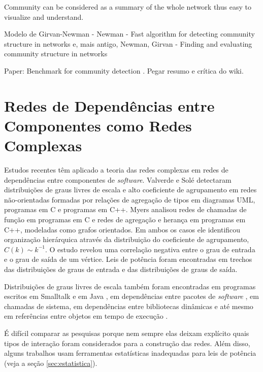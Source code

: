 ﻿\documentclass{article}
\begin{document}
Community can be considered as a summary of
the whole network thus easy to visualize and
understand.

Modelo de Girvan-Newman - Newman - Fast algorithm for detecting community structure in networks \cite{Newman2004b} e, mais antigo, Newman, Girvan - Finding and evaluating community structure in networks \cite{Newman2004a}

Paper: Benchmark for community detection \cite{Lancichinetti2008}. Pegar resumo e crítica do wiki.


\section{Redes de Dependências entre Componentes como Redes Complexas}

Estudos recentes têm aplicado a teoria das redes complexas em redes de dependências entre componentes de \textit{software}. Valverde e Solé \cite{Valverde2003} detectaram distribuições de graus livres de escala e alto coeficiente de agrupamento em redes não-orientadas formadas por relações de agregação de tipos em diagramas UML, programas em C e programas em C++. Myers \cite{Myers2003} analisou redes de chamadas de função em programas em C e redes de agregação e herança em programas em C++, modeladas como grafos orientados. Em ambos os casos ele identificou organização hierárquica através da distribuição do coeficiente de agrupamento, $C(k) \sim k^{-1}$. O estudo revelou uma correlação negativa entre o grau de entrada e o grau de saída de um vértice. Leis de potência foram encontradas em trechos das distribuições de graus de entrada e das distribuições de graus de saída.

Distribuições de graus livres de escala também foram encontradas em programas escritos em Smalltalk \cite{Marchesi2004,Concas2007} e em Java \cite{Hyland-Wood2006,Baxter2006,Ichii2008}, em dependências entre pacotes de \textit{software} \cite{Labelle2004}, em chamadas de sistema, em dependências entre bibliotecas dinâmicas \cite{Louridas2008} e até mesmo em referências entre objetos em tempo de execução \cite{Potanin2005}.

É difícil comparar as pesquisas porque nem sempre elas deixam explícito quais tipos de interação foram considerados para a construção das redes. Além disso, alguns trabalhos usam ferramentas estatísticas inadequadas para leis de potência (veja a seção \ref{sec:estatistica}).

\end{document}
